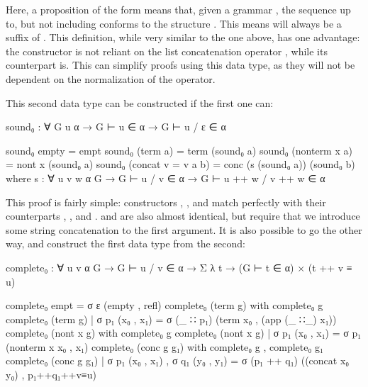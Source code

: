 	Here, a proposition of the form  means that,
	given a grammar , the sequence  up to, but not
	including  conforms to the structure . This means
	 will always be a suffix of . This definition, while
	very similar to the one above, has one advantage: the constructor
	 is not reliant on the list concatenation operator
	\codett{++}, while its counterpart  is. This can simplify
	proofs using this data type, as they will not be dependent on the
	normalization of the \codett{++} operator.

	This second data type can be constructed if the first one can:

	\begin{code}
		sound₀ :  ∀ {G u α} → G ⊢ u ∈ α → G ⊢ u / ε ∈ α

		sound₀ empty = empt
		sound₀ (term a) = term (sound₀ a)
		sound₀ (nonterm x a) = nont x (sound₀ a)
		sound₀ (concat {v = v} a b) = conc (s (sound₀ a)) (sound₀ b)
		  where
		    s : ∀ {u v w α G} →
		      G ⊢ u / v ∈ α →
		      G ⊢ u ++ w / v ++ w ∈ α
	\end{code}

	This proof is fairly simple: constructors , ,
	and  match perfectly with their counterparts ,
	, and .  and  are
	also almost identical, but require that we introduce some string
	concatenation to the first argument. It is also possible to go the other
	way, and construct the first data type from the second:

	\begin{code}
		complete₀ : ∀ {u v α G} → G ⊢ u / v ∈ α →
		  Σ λ t → (G ⊢ t ∈ α) × (t ++ v ≡ u)

		complete₀ empt = σ ε (empty , refl)
		complete₀ (term g) with complete₀ g
		complete₀ (term g) | σ p₁ (x₀ , x₁) = σ (_ ∷ p₁) (term x₀ , (app (_ ∷_) x₁))
		complete₀ (nont x g) with complete₀ g
		complete₀ (nont x g) | σ p₁ (x₀ , x₁) = σ p₁ (nonterm x x₀ , x₁)
		complete₀ (conc g g₁) with complete₀ g , complete₀ g₁
		complete₀ (conc g g₁) | σ p₁ (x₀ , x₁) , σ q₁ (y₀ , y₁) =
		  σ (p₁ ++ q₁) ((concat x₀ y₀) , p₁++q₁++v≡u)
	\end{code}

